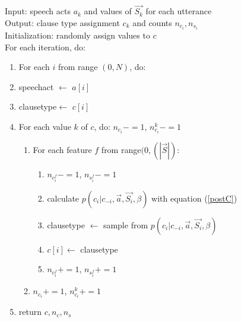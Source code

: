 \documentclass[../main.tex]{subfiles}
\begin{document}
Input: speech acts $a_{k}$ and values of $\vec{S_{k}}$ for each utterance\\
Output: clause type assignment $c_{k}$ and counts $n_{c_{i}}, n_{s_{i}}$\\
Initialization: randomly assign values to $c$\\
For each iteration, do:  
\begin{enumerate}
\item For each $i$ from range $(0,N)$, do:
\item speechact $\leftarrow$ $a[i]$
\item clausetype$\leftarrow$ $c[i]$ 
\item For each value $k$ of $c$, do:
$n_{c_{i}} -= 1$, $n^{k}_{c_{i}} -=1$
\begin{enumerate}
\item For each feature $f$ from range$(0, (|\vec{S}|)$:
\begin{enumerate}
\item $n_{c_{i}^{f}} -= 1$, $n_{s_{i}^{f}} -= 1$
\item calculate  $p(c_{i}| c_{-i}, \vec{a}, \vec{S_{i}}, \beta )$ with equation (\ref{postC})
\item clausetype $\leftarrow$ sample from $ p(c_{i}| c_{-i}, \vec{a}, \vec{S_{i}}, \beta )$
\item $c[i]\leftarrow$ clausetype
\item $n_{c_{i}^{f}} += 1$, $n_{s_{i}^{f}} += 1$
\end{enumerate}
\item $n_{c_{i}} += 1$, $n^{k}_{c_{i}} +=1$
\end{enumerate}
\item return $c, n_{c}, n_{s}$
\end{enumerate}


\dobib%
\end{document}
